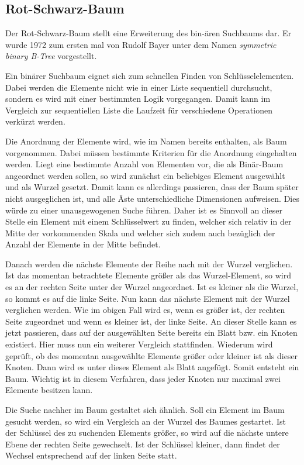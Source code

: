 \subsection{Rot-Schwarz-Baum}\label{s:rb_tree}
Der Rot-Schwarz-Baum stellt eine Erweiterung des bin-ären Suchbaums dar. Er wurde 1972 zum ersten mal von Rudolf Bayer unter dem Namen  \textit{symmetric binary B-Tree} vorgestellt.

Ein binärer Suchbaum eignet sich zum schnellen Finden von Schlüsselelementen. Dabei werden die Elemente nicht wie in einer Liste sequentiell durchsucht, sondern es wird mit einer bestimmten Logik vorgegangen.
Damit kann im Vergleich zur sequentiellen Liste die Laufzeit für verschiedene Operationen verkürzt werden.

Die Anordnung der Elemente wird, wie im Namen bereits enthalten, als Baum vorgenommen. Dabei müssen bestimmte Kriterien für die Anordnung eingehalten werden. Liegt eine bestimmte Anzahl von Elementen vor, die als Binär-Baum angeordnet werden sollen, so wird zunächst ein beliebiges Element ausgewählt und als Wurzel gesetzt. Damit kann es allerdings passieren, dass der Baum später nicht ausgeglichen ist, und alle Äste unterschiedliche Dimensionen aufweisen. Dies würde zu einer unausgewogenen Suche führen. Daher ist es Sinnvoll an dieser Stelle ein Element mit einem Schlüsselwert zu finden, welcher sich relativ in der Mitte der vorkommenden Skala und welcher sich zudem auch bezüglich der Anzahl der Elemente in der Mitte befindet.

Danach werden die nächste Elemente der Reihe nach mit der Wurzel verglichen. Ist das momentan betrachtete Elemente größer als das Wurzel-Element, so wird es an der rechten Seite unter der Wurzel angeordnet. Ist es kleiner als die Wurzel, so kommt es auf die linke Seite. Nun kann das nächste Element mit der Wurzel verglichen werden. Wie im obigen Fall wird es, wenn es größer ist, der rechten Seite zugeordnet und wenn es kleiner ist, der linke Seite. An dieser Stelle kann es jetzt passieren, dass auf der ausgewählten Seite bereits ein Blatt bzw. ein Knoten existiert. Hier muss nun ein weiterer Vergleich stattfinden. Wiederum wird geprüft, ob des momentan ausgewählte Elemente größer oder kleiner ist als dieser Knoten. Dann wird es unter dieses Element als Blatt angefügt. Somit entsteht ein Baum. Wichtig ist in diesem Verfahren, dass jeder Knoten nur maximal zwei Elemente besitzen kann. 

Die Suche nachher im Baum gestaltet sich ähnlich. Soll ein Element im Baum gesucht werden, so wird ein Vergleich an der Wurzel des Baumes gestartet. Ist der Schlüs\-sel des zu suchenden Elements größer, so wird auf die nächste untere Ebene der rechten Seite gewechselt. Ist der Schlüssel kleiner, dann findet der Wechsel entsprechend auf der linken Seite statt. 

